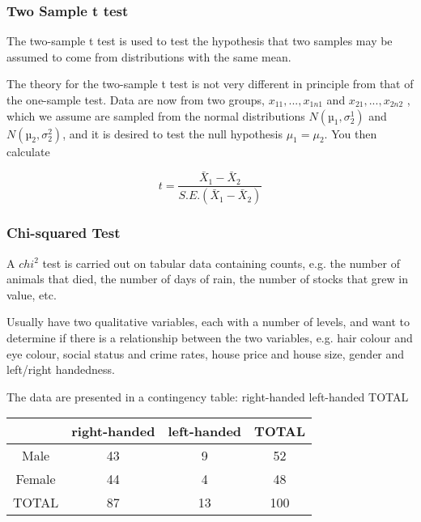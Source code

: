 


\subsubsection{Two Sample t test}

The two-sample t test is used to test the hypothesis that two samples may
be assumed to come from distributions with the same mean.

The theory for the two-sample t test is not very different in principle from
that of the one-sample test. Data are now from two groups, $x_{11}, . . . , x_{1n1}$
and $x_{21}, . . . , x_{2n2}$ , which we assume are sampled from the normal distributions
$N(µ_{1}, \sigma^{1}_{2} )$ and
$N(µ_{2}, \sigma^{2}_{2} )$, and it is desired to test the null hypothesis
$\mu_{1} = \mu_{2}$. You then calculate

\[
t = \frac{\bar{X}_{1}-\bar{X}_{2}}{S.E.(\bar{X}_{1}-\bar{X}_{2})}
\]



\subsubsection{Chi-squared Test}

A $chi^2$ test is carried out on tabular data containing counts, e.g. the
number of animals that died, the number of days of rain, the
number of stocks that grew in value, etc.

Usually have two qualitative variables, each with a number of
levels, and want to determine if there is a relationship between the
two variables, e.g. hair colour and eye colour, social status and
crime rates, house price and house size, gender and left/right
handedness.

The data are presented in a contingency table:
right-handed left-handed TOTAL

\begin{tabular}{|c|c|c|c|}
  \hline
  & right-handed &left-handed & TOTAL\\\hline
  Male & 43 & 9 & 52 \\
  Female & 44 & 4 & 48 \\
  TOTAL & 87 & 13 & 100 \\
  \hline
\end{tabular}


